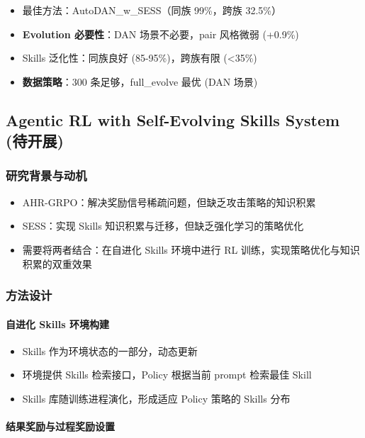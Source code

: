 \documentclass[12pt,a4paper]{article}
\newcommand{\highlight}[1]{\textcolor{primaryblue}{\textbf{#1}}}
\newcommand{\success}[1]{\textcolor{successgreen}{#1}}
\newcommand{\warning}[1]{\textcolor{warningorange}{#1}}
\begin{document}
\begin{itemize}
    \item \success{最佳方法}：AutoDAN\_w\_SESS（同族 99\%，跨族 32.5\%）
    \item \highlight{Evolution 必要性}：DAN 场景不必要，pair 风格微弱 (+0.9\%)
    \item \warning{Skills 泛化性}：同族良好 (85-95\%)，跨族有限 (<35\%)
    \item \highlight{数据策略}：300 条足够，full\_evolve 最优 (DAN 场景)
\end{itemize}

\subsection{Agentic RL with Self-Evolving Skills System (待开展)}

\subsubsection{研究背景与动机}

\begin{itemize}
    \item AHR-GRPO：解决奖励信号稀疏问题，但缺乏攻击策略的知识积累
    \item SESS：实现 Skills 知识积累与迁移，但缺乏强化学习的策略优化
    \item 需要将两者结合：在自进化 Skills 环境中进行 RL 训练，实现策略优化与知识积累的双重效果
\end{itemize}

\subsubsection{方法设计}

\paragraph{自进化 Skills 环境构建}

\begin{itemize}
    \item Skills 作为环境状态的一部分，动态更新
    \item 环境提供 Skills 检索接口，Policy 根据当前 prompt 检索最佳 Skill
    \item Skills 库随训练进程演化，形成适应 Policy 策略的 Skills 分布
\end{itemize}

\paragraph{结果奖励与过程奖励设置}
\end{document}
